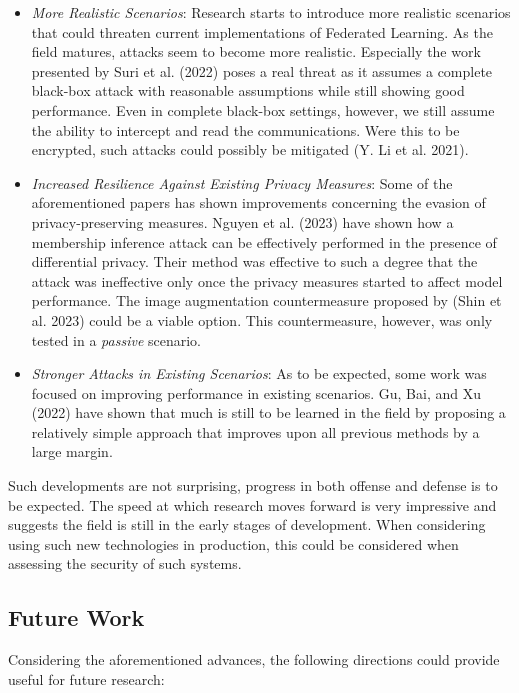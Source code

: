 \documentclass[
  compsoc]{IEEEtran}
\begin{document}
\begin{itemize}
\item
  \emph{More Realistic Scenarios}: Research starts to introduce more
  realistic scenarios that could threaten current implementations of
  Federated Learning. As the field matures, attacks seem to become more
  realistic. Especially the work presented by Suri et al. (2022) poses a
  real threat as it assumes a complete black-box attack with reasonable
  assumptions while still showing good performance. Even in complete
  black-box settings, however, we still assume the ability to intercept
  and read the communications. Were this to be encrypted, such attacks
  could possibly be mitigated (Y. Li et al. 2021).
\item
  \emph{Increased Resilience Against Existing Privacy Measures}: Some of
  the aforementioned papers has shown improvements concerning the
  evasion of privacy-preserving measures. Nguyen et al. (2023) have
  shown how a membership inference attack can be effectively performed
  in the presence of differential privacy. Their method was effective to
  such a degree that the attack was ineffective only once the privacy
  measures started to affect model performance. The image augmentation
  countermeasure proposed by (Shin et al. 2023) could be a viable
  option. This countermeasure, however, was only tested in a
  \emph{passive} scenario.
\item
  \emph{Stronger Attacks in Existing Scenarios}: As to be expected, some
  work was focused on improving performance in existing scenarios. Gu,
  Bai, and Xu (2022) have shown that much is still to be learned in the
  field by proposing a relatively simple approach that improves upon all
  previous methods by a large margin.
\end{itemize}

Such developments are not surprising, progress in both offense and
defense is to be expected. The speed at which research moves forward is
very impressive and suggests the field is still in the early stages of
development. When considering using such new technologies in production,
this could be considered when assessing the security of such systems.

\hypertarget{future-work}{%
\subsection{Future Work}\label{future-work}}

Considering the aforementioned advances, the following directions could
provide useful for future research:
\end{document}
